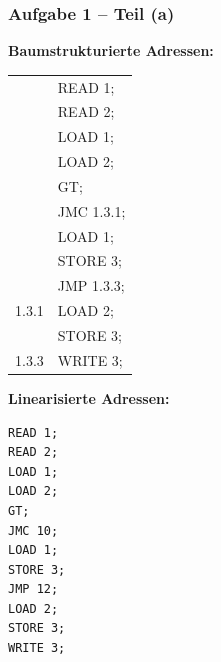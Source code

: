 \documentclass{beamer}
\begin{document}
\begin{frame}[fragile, t] \frametitle{Aufgabe 1 -- Teil (a)}
	\small 
	\begin{minipage}[t]{\dimexpr0.5\linewidth-\fboxrule-\fboxsep}
		\textbf{Baumstrukturierte Adressen:}  \\
		
		\footnotesize
		\begin{tabular}{>{\ttfamily}r >{\ttfamily}l}
			& READ 1; \\
			& READ 2; \\
			& LOAD 1; \\
			& LOAD 2; \\
			& GT; \\
			& JMC 1.3.1; \\
			& LOAD 1; \\
			& STORE 3; \\
			& JMP 1.3.3; \\
			\textcolor{cdgray!50}{\tiny 1.3.1} & LOAD 2; \\
			& STORE 3; \\
			\textcolor{cdgray!50}{\tiny 1.3.3} & WRITE 3; 
		\end{tabular}
	\end{minipage}
	\pause
	\begin{minipage}[t]{\dimexpr0.5\linewidth-\fboxrule-\fboxsep}
		\textbf{Linearisierte Adressen:} \\
		
		\begin{lstlisting}[style=am0]
READ 1;
READ 2;
LOAD 1;
LOAD 2;
GT; 
JMC 10;
LOAD 1;
STORE 3;
JMP 12;
LOAD 2;
STORE 3;
WRITE 3; 
		\end{lstlisting}
	\end{minipage}
\end{frame}
\end{document}
